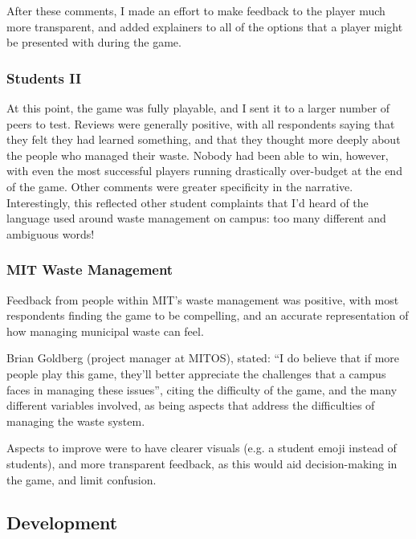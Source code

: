 \documentclass[nofonts,nols,justified,nobib]{tufte-book}
\begin{document}
After these comments, I made an effort to make feedback to the player much more transparent, and added explainers to all of the options that a player might be presented with during the game. 

\subsubsection*{Students II}

At this point, the game was fully playable, and I sent it to a larger number of peers to test. Reviews were generally positive, with all respondents saying that they felt they had learned something, and that they thought more deeply about the people who managed their waste. Nobody had been able to win, however, with even the most successful players running drastically over-budget at the end of the game. Other comments were greater specificity in the narrative. Interestingly, this reflected other student complaints that I'd heard of the language used around waste management on campus: too many different and ambiguous words!

\subsubsection*{MIT Waste Management}
Feedback from people within MIT's waste management was positive, with most respondents finding the game to be compelling, and an accurate representation of how managing municipal waste can feel.

Brian Goldberg (project manager at MITOS), stated: ``I do believe that if more people play this game, they’ll better appreciate the challenges that a campus faces in managing these issues'', citing the difficulty of the game, and the many different variables involved, as being aspects that address the difficulties of managing the waste system.

Aspects to improve were to have clearer visuals (e.g. a student emoji instead of students), and more transparent feedback, as this would aid decision-making in the game, and limit confusion.

\subsection*{Development}
\end{document}
